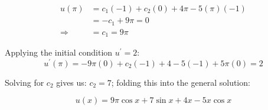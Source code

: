 \begin{align*}
u(\pi) &= c_1(-1)+c_2(0)+4\pi -5(\pi)(-1) \\
&=-c_1+9\pi = 0 \\
\Rightarrow &= c_1 = 9\pi
\end{align*}

\vspace{0.1cm}

\noindent Applying the initial condition $u^{\prime}=2$:
\begin{equation*}
u^{\prime}(\pi)=-9\pi(0)+c_2(-1)+4-5(-1)+5\pi(0)=2
\end{equation*}

\vspace{0.1cm}

\noindent Solving for $c_2$ gives us: $c_2 = 7$; folding this into the general solution:

\begin{equation*}
u(x) = 9\pi \cos{x}+7\sin{x}+4x-5x\cos{x}
\end{equation*}

